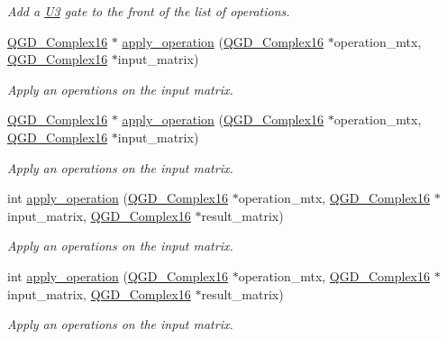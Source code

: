 \begin{DoxyCompactItemize}
\begin{DoxyCompactList}\small\item\em Add a \hyperlink{class_u3}{U3} gate to the front of the list of operations. \end{DoxyCompactList}\item 
\hyperlink{struct_q_g_d___complex16}{Q\+G\+D\+\_\+\+Complex16} $\ast$ \hyperlink{class_decomposition___base_a4963d3fe033c225eb19a0e6f271ef37a}{apply\+\_\+operation} (\hyperlink{struct_q_g_d___complex16}{Q\+G\+D\+\_\+\+Complex16} $\ast$operation\+\_\+mtx, \hyperlink{struct_q_g_d___complex16}{Q\+G\+D\+\_\+\+Complex16} $\ast$input\+\_\+matrix)
\begin{DoxyCompactList}\small\item\em Apply an operations on the input matrix. \end{DoxyCompactList}\item 
\hyperlink{struct_q_g_d___complex16}{Q\+G\+D\+\_\+\+Complex16} $\ast$ \hyperlink{class_decomposition___base_a07d2b71ccdf4925377ee18bc552bb257}{apply\+\_\+operation} (\hyperlink{struct_q_g_d___complex16}{Q\+G\+D\+\_\+\+Complex16} $\ast$operation\+\_\+mtx, \hyperlink{struct_q_g_d___complex16}{Q\+G\+D\+\_\+\+Complex16} $\ast$input\+\_\+matrix)
\begin{DoxyCompactList}\small\item\em Apply an operations on the input matrix. \end{DoxyCompactList}\item 
int \hyperlink{class_decomposition___base_aa6d12ac493c26af71613bc570fb87858}{apply\+\_\+operation} (\hyperlink{struct_q_g_d___complex16}{Q\+G\+D\+\_\+\+Complex16} $\ast$operation\+\_\+mtx, \hyperlink{struct_q_g_d___complex16}{Q\+G\+D\+\_\+\+Complex16} $\ast$input\+\_\+matrix, \hyperlink{struct_q_g_d___complex16}{Q\+G\+D\+\_\+\+Complex16} $\ast$result\+\_\+matrix)
\begin{DoxyCompactList}\small\item\em Apply an operations on the input matrix. \end{DoxyCompactList}\item 
int \hyperlink{class_decomposition___base_aa6d12ac493c26af71613bc570fb87858}{apply\+\_\+operation} (\hyperlink{struct_q_g_d___complex16}{Q\+G\+D\+\_\+\+Complex16} $\ast$operation\+\_\+mtx, \hyperlink{struct_q_g_d___complex16}{Q\+G\+D\+\_\+\+Complex16} $\ast$input\+\_\+matrix, \hyperlink{struct_q_g_d___complex16}{Q\+G\+D\+\_\+\+Complex16} $\ast$result\+\_\+matrix)
\begin{DoxyCompactList}\small\item\em Apply an operations on the input matrix. \end{DoxyCompactList}\item 

\end{DoxyCompactItemize}
